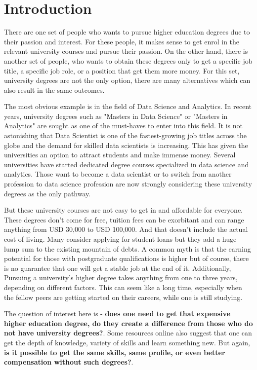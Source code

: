 \chapter{Introduction}
There are one set of people who wants to pursue higher education degrees due to their passion and interest. For these people, it makes sense to get enrol in the relevant university courses and pursue their passion. On the other hand, there is another set of people, who wants to obtain these degrees only to get a specific job title, a specific job role, or a position that get them more money. For this set, university degrees are not the only option, there are many alternatives which can also result in the same outcomes.

The most obvious example is in the field of Data Science and Analytics. In recent years, university degrees such as "Masters in Data Science" or "Masters in Analytics" are sought as one of the must-haves to enter into this field. It is not astonishing that Data Scientist is one of the fastest-growing job titles across the globe and the demand for skilled data scientists is increasing. This has given the universities an option to attract students and make immense money. Several universities have started dedicated degree courses specialized in data science and analytics. Those want to become a data scientist or to switch from another profession to data science profession are now strongly considering these university degrees as the only pathway.

But these university courses are not easy to get in and affordable for everyone. These degrees don’t come for free, tuition fees can be exorbitant and can range anything from USD 30,000 to USD 100,000. And that doesn’t include the actual cost of living. Many consider applying for student loans but they add a huge lump sum to the existing mountain of debts. A common myth is that the earning potential for those with postgraduate qualifications is higher but of course, there is no guarantee that one will get a stable job at the end of it. Additionally, Pursuing a university’s higher degree takes anything from one to three years, depending on different factors. This can seem like a long time, especially when the fellow peers are getting started on their careers, while one is still studying.

The question of interest here is - \textbf{does one need to get that expensive higher education degree, do they create a difference from those who do not have university degrees?}. Some resources online also suggest that one can get the depth of knowledge, variety of skills and learn something new. But again, \textbf{is it possible to get the same skills, same profile, or even better compensation without such degrees?}.

